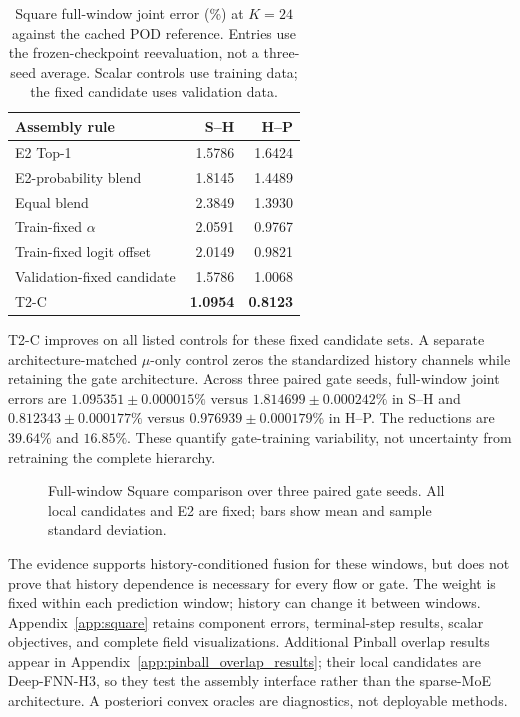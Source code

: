 \begin{table}[H]
\centering
\small
\caption{Square full-window joint error (\%) at $K=24$ against the
cached POD reference. Entries use the frozen-checkpoint reevaluation,
not a three-seed average. Scalar controls use training data;
the fixed candidate uses validation data.}
\label{tab:routing_fusion}
\begin{tabular}{@{}lrr@{}}
\toprule
Assembly rule & S--H & H--P\\
\midrule
E2 Top-1 & 1.5786 & 1.6424\\
E2-probability blend & 1.8145 & 1.4489\\
Equal blend & 2.3849 & 1.3930\\
Train-fixed $\alpha$ & 2.0591 & 0.9767\\
Train-fixed logit offset & 2.0149 & 0.9821\\
Validation-fixed candidate & 1.5786 & 1.0068\\
T2-C & \textbf{1.0954} & \textbf{0.8123}\\
\bottomrule
\end{tabular}
\end{table}

T2-C improves on all listed controls for these fixed candidate
sets. A separate architecture-matched $\mu$-only control zeros the
standardized history channels while retaining the gate architecture.
Across three paired gate seeds, full-window joint errors are
$1.095351\pm0.000015\%$ versus $1.814699\pm0.000242\%$
in S--H and $0.812343\pm0.000177\%$ versus
$0.976939\pm0.000179\%$ in H--P.
The reductions are $39.64\%$ and $16.85\%$.
These quantify gate-training variability, not uncertainty from
retraining the complete hierarchy.

\begin{figure}[H]
\centering

\caption{Full-window Square comparison over three paired gate seeds.
All local candidates and E2 are fixed; bars show mean and sample
standard deviation.}
\label{fig:square_overlap}
\end{figure}

The evidence supports history-conditioned fusion for these windows,
but does not prove that history dependence is necessary for every
flow or gate. The weight is fixed within each prediction window;
history can change it between windows.
Appendix~\ref{app:square} retains component errors, terminal-step
results, scalar objectives, and complete field visualizations.
Additional Pinball overlap results appear in
Appendix~\ref{app:pinball_overlap_results}; their local candidates
are Deep-FNN-H3, so they test the assembly interface rather than
the sparse-MoE architecture.
A posteriori convex oracles are diagnostics, not deployable methods.

